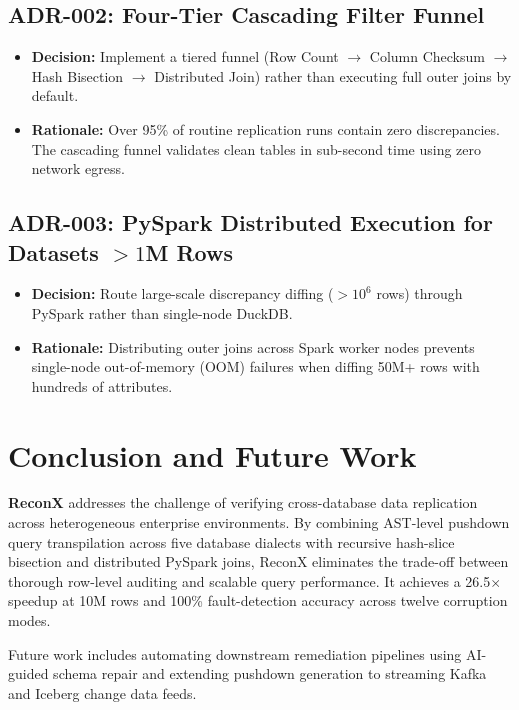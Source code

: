 \documentclass[10pt,journal,compsoc]{IEEEtran}
\begin{document}
\subsection{ADR-002: Four-Tier Cascading Filter Funnel}
\begin{itemize}
    \item \textbf{Decision:} Implement a tiered funnel (Row Count $\to$ Column Checksum $\to$ Hash Bisection $\to$ Distributed Join) rather than executing full outer joins by default.
    \item \textbf{Rationale:} Over 95\% of routine replication runs contain zero discrepancies. The cascading funnel validates clean tables in sub-second time using zero network egress.
\end{itemize}

\subsection{ADR-003: PySpark Distributed Execution for Datasets $>1$M Rows}
\begin{itemize}
    \item \textbf{Decision:} Route large-scale discrepancy diffing ($> 10^6$ rows) through PySpark rather than single-node DuckDB.
    \item \textbf{Rationale:} Distributing outer joins across Spark worker nodes prevents single-node out-of-memory (OOM) failures when diffing 50M+ rows with hundreds of attributes.
\end{itemize}

\section{Conclusion and Future Work}
\textbf{ReconX} addresses the challenge of verifying cross-database data replication across heterogeneous enterprise environments. By combining AST-level pushdown query transpilation across five database dialects with recursive hash-slice bisection and distributed PySpark joins, ReconX eliminates the trade-off between thorough row-level auditing and scalable query performance. It achieves a 26.5$\times$ speedup at 10M rows and 100\% fault-detection accuracy across twelve corruption modes.

Future work includes automating downstream remediation pipelines using AI-guided schema repair and extending pushdown generation to streaming Kafka and Iceberg change data feeds.
\end{document}

